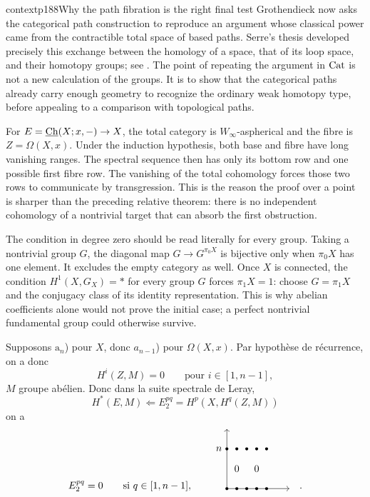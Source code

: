 \begin{dcomment}{context}{p188}{Why the path fibration is the right final test}
Grothendieck now asks the categorical path construction to reproduce an argument whose classical power came from the contractible total space of based paths. Serre's thesis developed precisely this exchange between the homology of a space, that of its loop space, and their homotopy groups; see \citet[Chapter~IV, \S5, Proposition~7]{Serre1951}. The point of repeating the argument in $\mathrm{Cat}$ is not a new calculation of the groups. It is to show that the categorical paths already carry enough geometry to recognize the ordinary weak homotopy type, before appealing to a comparison with topological paths.

For $E=\underline{\mathrm{Ch}}(X;x,-)\to X$, the total category is $W_\infty$-aspherical and the fibre is $Z=\Omega(X,x)$. Under the induction hypothesis, both base and fibre have long vanishing ranges. The spectral sequence then has only its bottom row and one possible first fibre row. The vanishing of the total cohomology forces those two rows to communicate by transgression. This is the reason the proof over a point is sharper than the preceding relative theorem: there is no independent cohomology of a nontrivial target that can absorb the first obstruction.

The condition in degree zero should be read literally for every group. Taking a nontrivial group $G$, the diagonal map $G\to G^{\pi_0X}$ is bijective only when $\pi_0X$ has one element. It excludes the empty category as well. Once $X$ is connected, the condition $H^1(X,G_X)=*$ for every group $G$ forces $\pi_1X=1$: choose $G=\pi_1X$ and the conjugacy class of its identity representation. This is why abelian coefficients alone would not prove the initial case; a perfect nontrivial fundamental group could otherwise survive.
\end{dcomment}


Supposons $\mathrm{a}_n$) pour $X$, donc $a_{n-1}$) pour $\Omega(X,x)$. Par hypothèse de récurrence, on a donc
\[
H^i(Z,M) = 0 \qquad \text{pour } i \in [1,n-1],
\]
$M$ groupe abélien. Donc dans la suite spectrale de Leray,
\[
H^*(E,M) \Longleftarrow E_2^{pq} = H^p(X,H^q(Z,M))
\]
on a
\[
E_2^{pq} = 0 \qquad \text{si } q \in [1,n-1], \qquad
\begin{tikzpicture}[baseline=0]
\draw[->] (0,0) -- (2.2,0);
\draw[->] (0,0) -- (0,2.1);
\foreach \x in {0,0.35,0.7,1.05,1.4} {
  \fill (\x,0) circle (1.5pt);
  \fill (\x,1.4) circle (1.5pt);
}
\node[left] at (-0.05,1.4) {$n$};
\node at (0.35,0.7) {$0$};
\node at (1.05,0.7) {$0$};
\end{tikzpicture}
\quad .
\]

